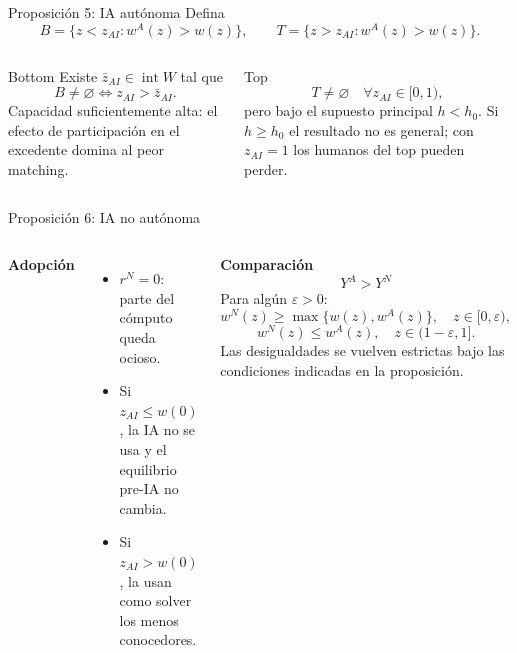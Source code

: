 \documentclass[aspectratio=169,11pt]{beamer}
\newcommand{\clave}[1]{\textcolor{Petroleo}{\textbf{#1}}}
\begin{document}
\begin{frame}{Proposici\'on 5: IA aut\'onoma}
Defina
\[B=\{z<z_{AI}:w^A(z)>w(z)\},\qquad T=\{z>z_{AI}:w^A(z)>w(z)\}.\]
\begin{columns}[T,onlytextwidth]
\begin{block}{Bottom}
Existe $\bar z_{AI}\in\operatorname{int}W$ tal que
\[B\neq\varnothing\iff z_{AI}>\bar z_{AI}.\]
Capacidad suficientemente alta: el efecto de participaci\'on en el excedente domina al peor matching.
\end{block}
\begin{block}{Top}
\[T\neq\varnothing\quad\forall z_{AI}\in[0,1),\]
pero bajo el supuesto principal $h<h_0$. Si $h\ge h_0$ el resultado no es general; con $z_{AI}=1$ los humanos del top pueden perder.
\end{block}
\end{columns}
\end{frame}

\begin{frame}{Proposici\'on 6: IA no aut\'onoma}
\begin{columns}[T,onlytextwidth]
\clave{Adopci\'on}
\begin{itemize}\small
\item $r^N=0$: parte del c\'omputo queda ocioso.
\item Si $z_{AI}\le w(0)$, la IA no se usa y el equilibrio pre-IA no cambia.
\item Si $z_{AI}>w(0)$, la usan como solver los menos conocedores.
\end{itemize}
\clave{Comparaci\'on}
\[\boxed{Y^A>Y^N}\]
Para alg\'un $\varepsilon>0$:
\[w^N(z)\ge\max\{w(z),w^A(z)\},\quad z\in[0,\varepsilon),\]
\[w^N(z)\le w^A(z),\quad z\in(1-\varepsilon,1].\]
Las desigualdades se vuelven estrictas bajo las condiciones indicadas en la proposici\'on.
\end{columns}
\end{frame}
\end{document}
